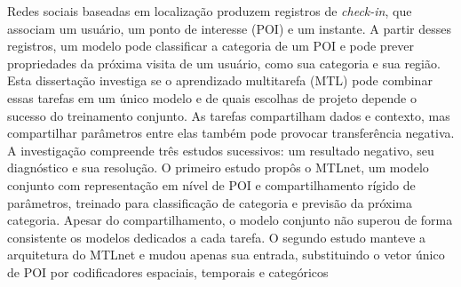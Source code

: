 \begin{resumo}[Resumo]
        \noindent Redes sociais baseadas em localização produzem registros de
        \emph{check-in}, que associam um usuário, um ponto de interesse (POI) e um
        instante. A partir desses registros, um modelo pode classificar a categoria de
        um POI e pode prever propriedades da próxima visita de um usuário, como sua
        categoria e sua região. Esta dissertação investiga se o aprendizado
        multitarefa (MTL) pode combinar essas tarefas em um único modelo e de quais
        escolhas de projeto depende o sucesso do treinamento conjunto. As tarefas
        compartilham dados e contexto, mas compartilhar parâmetros entre elas também
        pode provocar transferência negativa. A investigação compreende três estudos
        sucessivos: um resultado negativo, seu diagnóstico e sua resolução. O primeiro
        estudo propôs o MTLnet, um modelo conjunto com representação em nível de POI e
        compartilhamento rígido de parâmetros, treinado para classificação de categoria
        e previsão da próxima categoria. Apesar do compartilhamento, o modelo conjunto
        não superou de forma consistente os modelos dedicados a cada tarefa. O segundo
        estudo manteve a arquitetura do MTLnet e mudou apenas sua entrada, substituindo
        o vetor único de POI por codificadores espaciais, temporais e categóricos

\end{resumo}

